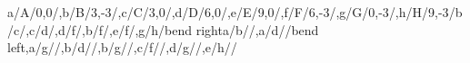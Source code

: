 \begin{compatibilitygraph}{a/A/{0,0}/,b/B/{3,-3}/,c/C/{3,0}/,d/D/{6,0}/,e/E/{9,0}/,f/F/{6,-3}/,g/G/{0,-3}/,h/H/{9,-3}/}{b/c/,c/d/,d/f/,b/f/,e/f/,g/h/bend right}{a/b//,a/d//bend left,a/g//,b/d//,b/g//,c/f//,d/g//,e/h//}{}{}
\end{compatibilitygraph}